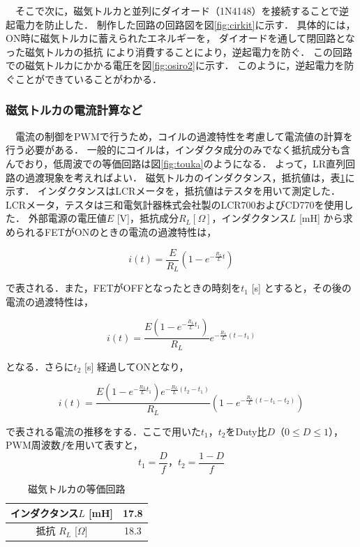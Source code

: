 　そこで次に，磁気トルカと並列にダイオード（1N4148）を接続することで逆起電力を防止した．
制作した回路の回路図を図\ref{fig:cirkit}に示す．
具体的には，ON時に磁気トルカに蓄えられたエネルギーを，
ダイオードを通して閉回路となった磁気トルカの抵抗
により消費することにより，逆起電力を防ぐ．
この回路での磁気トルカにかかる電圧を図\ref{fig:osiro2}に示す．
このように，逆起電力を防ぐことができていることがわかる．

\subsubsection{磁気トルカの電流計算など}

　電流の制御をPWMで行うため，コイルの過渡特性を考慮して電流値の計算を行う必要がある．
一般的にコイルは，インダクタ成分のみでなく抵抗成分も含んでおり，低周波での等価回路は図\ref{fig:touka}のようになる．
よって，LR直列回路の過渡現象を考えればよい．
磁気トルカのインダクタンス，抵抗値は，表\ref{table:torquer2}に示す．
インダクタンスはLCRメータを，抵抗値はテスタを用いて測定した．LCRメータ，テスタは三和電気計器株式会社製のLCR700およびCD770を使用した．
外部電源の電圧値$E$ [V]，抵抗成分$R_L [\Omega]$，インダクタンス$L$ [mH] から求められるFETがONのときの電流の過渡特性は，


\begin{equation}
	i(t) = \frac{E}{R_L}\left(1-e^{-\frac{R_L}{L}t}\right)
\end{equation}

で表される．また，FETがOFFとなったときの時刻を$t_1$ [s] とすると，その後の電流の過渡特性は，

\begin{equation}
	i(t) = \frac{E\left(1-e^{-\frac{R_L}{L}t_1}\right)}{R_L}e^{-\frac{R_L}{L}(t-t_1)}
\end{equation}

となる．さらに$t_2$ [s] 経過してONとなり，

\begin{equation}
	i(t) = \frac{E\left(1-e^{-\frac{R_L}{L}t_1}\right)e^{-\frac{R_L}{L}(t_2-t_1)}}{R_L}\left(1-e^{-\frac{R_L}{L}(t-t_1-t_2)}\right)
\end{equation}

で表される電流の推移をする．ここで用いた$t_1，t_2$をDuty比$D$（$0\leq D\leq1$），PWM周波数$f$を用いて表すと，
\begin{equation}
	t_1 = \frac{D}{f}，t_2 = \frac{1-D}{f}
\end{equation}

\begin{table}[H]
	\centering
	\caption{磁気トルカの等価回路}
	\label{table:torquer2}
	\begin{tabular}{|c||c|}
		\hline
		インダクタンス$L$ [mH] & 17.8 \\ \hline
		抵抗 $R_L$ [$\Omega $] & 18.3 \\ \hline 
	\end{tabular}
\end{table}

